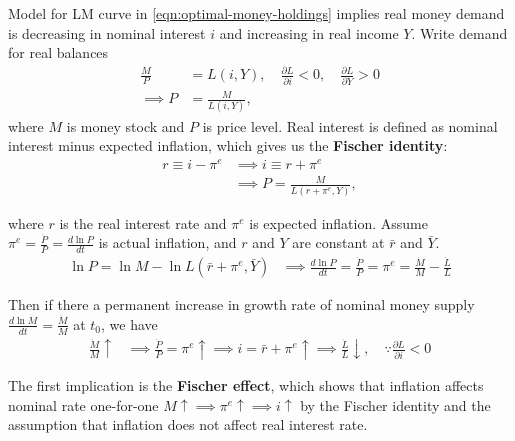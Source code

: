 \documentclass{article}
\newcommand{\?}{\textcolor{red}{(?)}} %
\begin{document}
        Model for LM curve in \eqref{eqn:optimal-money-holdings} implies real money demand is decreasing in nominal interest $i$ and increasing in real income $Y$. Write demand for real balances
        \begin{align}
            \frac{M}{P} &= L(i, Y),
            \quad \frac{\partial L}{\partial i} < 0,
            \quad \frac{\partial L}{\partial Y} > 0
            \\
            \implies
            P &= \frac{M}{L(i, Y)},
        \end{align}
        where $M$ is money stock and $P$ is price level. Real interest is defined as nominal interest minus expected inflation, which gives us the \textbf{Fischer identity}:
        \begin{align}
            r \equiv i - \pi^e
            &\implies
            i \equiv r + \pi^e
            \\
            &\implies
            P = \frac{M}{L(r + \pi^e, Y)},
        \end{align}
        
        where $r$ is the real interest rate and $\pi^e$ is expected inflation. Assume $\pi^e = \frac{\dot P}{P} = \frac{d \ln P}{d t}$ is actual inflation, and $r$ and $Y$ are constant at $\bar{r}$ and $\bar{Y}$.
        \begin{align}
            \ln P = \ln M - \ln L(\bar r + \pi^e, \bar Y)
            &\implies
            \frac{d \ln{P}}{d t} = \frac{\dot{P}}{P} = \pi^e = \frac{\dot M}{M} - \frac{\dot L}{L}
        \end{align}
        
        Then if there a permanent increase in growth rate of nominal money supply $\frac{d \ln M}{d t} = \frac{\dot{M}}{M}$ at $t_0$, we have
        \begin{align}
            \frac{\dot M}{M} \uparrow
            & \implies
            \frac{\dot P}{P} = \pi^e \uparrow
            \label{eqn:fischer-effect}
            \implies
            i = \bar r + \pi^e \uparrow
            \implies
            \frac{\dot L}{L} \downarrow,
            \quad \because
            \frac{\partial L}{\partial i} < 0
        \end{align}
        
        The first implication is the \textbf{Fischer effect}, which shows that inflation affects nominal rate one-for-one $M \uparrow \implies \pi^e \uparrow \implies i \uparrow$ by the Fischer identity and the assumption that inflation does not affect real interest rate.
        
\end{document}
